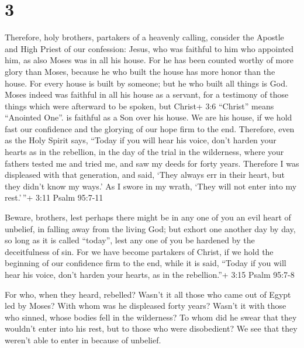 \hypertarget{section-2}{%
\section{3}\label{section-2}}

 Therefore, holy brothers, partakers of a heavenly calling,
consider the Apostle and High Priest of our confession: Jesus,
 who was faithful to him who appointed him, as also Moses
was in all his house.  For he has been counted worthy of
more glory than Moses, because he who built the house has more honor
than the house.  For every house is built by someone; but he
who built all things is God.  Moses indeed was faithful in
all his house as a servant, for a testimony of those things which were
afterward to be spoken,  but Christ+ 3:6 ``Christ'' means
``Anointed One''. is faithful as a Son over his house. We are his house,
if we hold fast our confidence and the glorying of our hope firm to the
end.  Therefore, even as the Holy Spirit says, ``Today if
you will hear his voice,  don't harden your hearts as in the
rebellion, in the day of the trial in the wilderness,  where
your fathers tested me and tried me, and saw my deeds for forty years.
 Therefore I was displeased with that generation, and said,
`They always err in their heart, but they didn't know my ways.'
 As I swore in my wrath, `They will not enter into my
rest.'\,''+ 3:11 Psalm 95:7-11

 Beware, brothers, lest perhaps there might be in any one
of you an evil heart of unbelief, in falling away from the living God;
 but exhort one another day by day, so long as it is called
``today'', lest any one of you be hardened by the deceitfulness of sin.
 For we have become partakers of Christ, if we hold the
beginning of our confidence firm to the end,  while it is
said, ``Today if you will hear his voice, don't harden your hearts, as
in the rebellion.''+ 3:15 Psalm 95:7-8

 For who, when they heard, rebelled? Wasn't it all those
who came out of Egypt led by Moses?  With whom was he
displeased forty years? Wasn't it with those who sinned, whose bodies
fell in the wilderness?  To whom did he swear that they
wouldn't enter into his rest, but to those who were disobedient?
 We see that they weren't able to enter in because of
unbelief.

